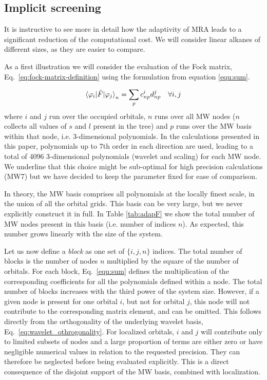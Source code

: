\documentclass[journal=jctcce, manuscript=article]{achemso}
\begin{document}
\subsection{Implicit screening} 
\label{sec:screen}

It is instructive to see more in detail how the adaptivity of \ac{MRA} leads to a significant reduction of the computational cost. We will consider linear alkanes of different sizes, as they are easier to compare.

As a first illustration we will consider the evaluation  of the Fock matrix, Eq.~\eqref{eq:fock-matrix-definition} using the formulation from equation \eqref{equ:sum}.

\begin{equation}
\label{equ:sums}
 \braket{\varphi_i | {\hat F} |\varphi_j}_n = \sum_{p} c^i_{np} d^j_{np} \quad\forall i,j  
\end{equation}
where $i$ and $j$ run over the occupied orbitals, $n$ runs over all \ac{MW} nodes ($n$ collects all values of $s$ and $l$ present in the tree) and
$p$ runs over the \ac{MW} basis within that node, i.e. 3-dimensional polynomials. In the calculations presented in this paper, polynomials up to 7th order in each direction are used, leading to a total of 4096 3-dimensional polynomials (wavelet and scaling) for each \ac{MW} node. We underline that this choice might be sub-optimal for high precision calculations (MW7) but we have decided to keep the parameter fixed for ease of comparison.

In theory, the \ac{MW} basis comprises all polynomials at the locally finest scale, in the union of all the orbital grids. This basis can be very large, but we never explicitly construct it in full. In Table \ref{tab:adapF} we show the total number of \ac{MW} nodes present in this basis (i.e. number of indices $n$). As expected, this number grows linearly with the size of the system.
 
Let us now define a \emph{block} as one set of $\lbrace i,j,n\rbrace$ indices. The total number of blocks  is the number of nodes $n$ multiplied by the square of the number of orbitals. For each block, Eq.~\eqref{equ:sum} defines the multiplication of the corresponding coefficients for all the polynomials defined within a node. The total number of blocks increases with the third power of the system size. However, if a given node is present for one orbital $i$, but not for orbital $j$, this node will not contribute to the corresponding matrix element, and can be omitted. This follows directly from the orthogonality of the underlying wavelet basis, Eq.~\ref{eq:wavelet_othrogonality}. For localized orbitals, $i$ and $j$ will contribute only to limited subsets of nodes and a large proportion of terms are either zero or have negligible numerical values in relation to the requested precision. They can therefore be neglected before being evaluated explicitly. This is a direct consequence of the disjoint support of the \ac{MW} basis, combined with localization.
 
\end{document}
